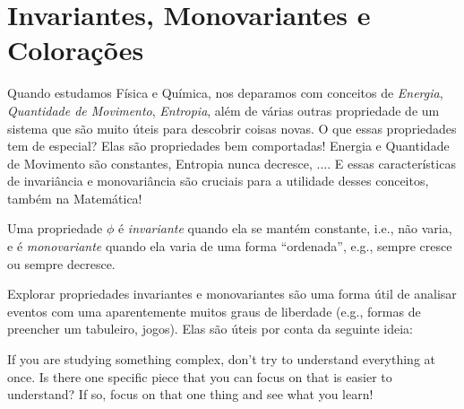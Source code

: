 \chapter{Invariantes, Monovariantes e Colorações}

Quando estudamos Física e Química, nos deparamos com conceitos de \emph{Energia}, \emph{Quantidade de Movimento}, \emph{Entropia}, além de várias outras propriedade de um sistema que são muito úteis para descobrir coisas novas. O que essas propriedades tem de especial? Elas são propriedades bem comportadas! Energia e Quantidade de Movimento são constantes, Entropia nunca decresce, $\dots$. E essas características de invariância e monovariância são cruciais para a utilidade desses conceitos, também na Matemática!

Uma propriedade $\phi$ é \emph{invariante} quando ela se mantém constante, i.e., não varia, e é \emph{monovariante} quando ela varia de uma forma ``ordenada'', e.g., sempre cresce ou sempre decresce.

Explorar propriedades invariantes e monovariantes são uma forma útil de analisar eventos com uma aparentemente muitos graus de liberdade (e.g., formas de preencher um tabuleiro, jogos). Elas são úteis por conta da seguinte ideia:

\begin{idea}
	If you are studying something complex, don’t try to understand everything at once. Is there one specific piece that you can focus on that is easier to understand? If so, focus on that one thing and see what you learn!
\end{idea}

